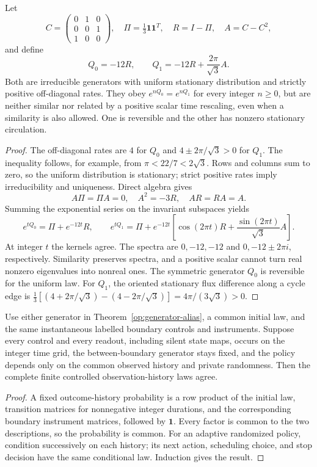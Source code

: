 \begin{theorem}
\label{op:generator-alias}
Let
\[
 C=\begin{pmatrix}0&1&0\\0&0&1\\1&0&0\end{pmatrix},\quad
 \Pi=\tfrac13\mathbf1\mathbf1^T,\quad R=I-\Pi,\quad A=C-C^2,
\]
and define
\[
 Q_0=-12R,\qquad Q_1=-12R+\frac{2\pi}{\sqrt3}A .
\]
Both are irreducible generators with uniform stationary distribution
and strictly positive off-diagonal rates.
They obey \(e^{nQ_0}=e^{nQ_1}\) for every integer \(n\ge0\), but are
neither similar nor related by a positive scalar time rescaling,
even when a similarity is also allowed.
One is reversible and the other has nonzero stationary circulation.
\end{theorem}
\begin{proof}
The off-diagonal rates are \(4\) for \(Q_0\) and
\(4\pm2\pi/\sqrt3>0\) for \(Q_1\).
The inequality follows, for example, from
\(\pi<22/7<2\sqrt3\).
Rows and columns sum to zero, so the uniform distribution is
stationary; strict positive rates imply irreducibility and uniqueness.
Direct algebra gives
\[
 A\Pi=\Pi A=0,\quad A^2=-3R,\quad AR=RA=A.
\]
Summing the exponential series on the invariant subspaces yields
\[
 e^{tQ_0}=\Pi+e^{-12t}R,\qquad
 e^{tQ_1}=\Pi+e^{-12t}
 \left[\cos(2\pi t)R+\frac{\sin(2\pi t)}{\sqrt3}A\right].
\]
At integer \(t\) the kernels agree.
The spectra are \(0,-12,-12\) and \(0,-12\pm2\pi i\), respectively.
Similarity preserves spectra, and a positive scalar cannot turn real
nonzero eigenvalues into nonreal ones.
The symmetric generator \(Q_0\) is reversible for the uniform law.
For \(Q_1\), the oriented stationary flux difference along a cycle edge
is \(\frac13[(4+2\pi/\sqrt3)-(4-2\pi/\sqrt3)]
=4\pi/(3\sqrt3)>0\).
\end{proof}

\begin{proposition}
\label{op:grid-policy}
Use either generator in Theorem~\ref{op:generator-alias}, a common
initial law, and the same instantaneous labelled boundary controls
and instruments.  Suppose every control and every readout, including
silent state maps, occurs on the integer time grid, the between-boundary
generator stays fixed, and the policy depends only on the common
observed history and private randomness.
Then the complete finite controlled observation-history laws agree.
\end{proposition}
\begin{proof}
A fixed outcome-history probability is a row product of the initial
law, transition matrices for nonnegative integer durations, and the
corresponding boundary instrument matrices, followed by \(\mathbf1\).
Every factor is common to the two descriptions, so the probability
is common.  For an adaptive randomized policy, condition successively
on each history; its next action, scheduling choice, and stop decision
have the same conditional law.  Induction gives the result.
\end{proof}

